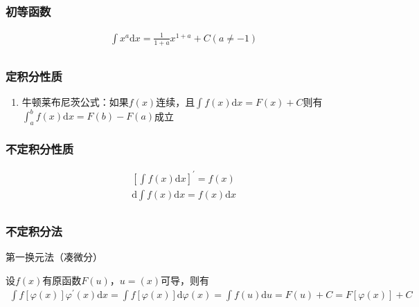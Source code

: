 \documentclass[12pt]{book}
\begin{document}
\subsubsection{初等函数}


\begin{align*}
& \int x^{a}\mathrm{d}x =\frac{1}{1+a}x^{1+a}+C (a\neq -1)  \\
\end{align*}





\subsubsection{定积分性质}



\begin{enumerate}[1.]
    \item 牛顿莱布尼茨公式：如果$f(x)$连续，且$\int{f(x)\mathrm{d}x} = F(x)+C$则有$\int_{a}^{b}{f(x)\mathrm{d}x}=F(b)-F(a)$成立
\end{enumerate}













\subsubsection{不定积分性质}



\begin{align*}
& [\int f(x)\mathrm{d}x]^\prime = f(x) \\
& \mathrm{d}\int f(x)\mathrm{d}x= f(x)\mathrm{d}x \\
\end{align*}




\subsubsection{不定积分法}


第一换元法（凑微分）

设$f(x)$有原函数$F(u)$，$u=(x)$可导，则有
\begin{gather*}
    \int{f[\varphi(x)]\varphi^\prime(x)\mathrm{d}x} 
    = \int{f[\varphi(x)]\mathrm{d}\varphi(x)} 
    = \int{f(u)\mathrm{d}u} 
    = F(u)+C = F[\varphi(x)]+C
\end{gather*}
\end{document}
